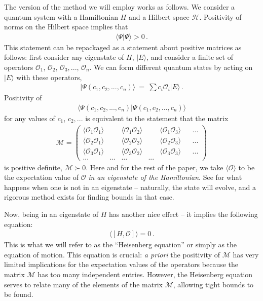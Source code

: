 \documentclass[a4paper,11pt]{article}
\newcommand{\M}{{\mathcal M}}
\numberwithin{equation}{section}
\begin{document}
The version of the method we will employ works as follows. We consider a quantum system with a Hamiltonian $H$ and a Hilbert space $\mathcal H$. Positivity of norms on the Hilbert space implies that 
%
\begin{align}
    \langle \Psi | \Psi \rangle > 0 \, .
\end{align}
%
This statement can be repackaged as a statement about positive matrices as follows: first consider any eigenstate of $H$, $| E \rangle$, and consider a finite set of operators $\mathcal{O}_1$, $\mathcal{O}_2$, $\mathcal{O}_3, ... $, $\mathcal{O}_n$. We can form different quantum states by acting on $|E \rangle$ with these operators,
%
\begin{align}
    | \Psi (c_1, c_2, ..., c_n) \rangle \ = \ \sum c_i \mathcal{O}_i |E \rangle \, .
\end{align}
%
Positivity of 
%
\begin{align}
    \langle \Psi (c_1, c_2, ..., c_n)  | \Psi (c_1, c_2, ..., c_n) \rangle
\end{align}
%
for any values of $c_1$, $c_2, ...$ is equivalent to the statement that the matrix
%
\begin{align}
    \M = \begin{pmatrix}
        \langle \mathcal{O}_1 \mathcal{O}_1 \rangle && \langle \mathcal{O}_1 \mathcal{O}_2 \rangle && \langle \mathcal{O}_1 \mathcal{O}_3 \rangle && ... \\
        \langle \mathcal{O}_2 \mathcal{O}_1 \rangle && \langle \mathcal{O}_2 \mathcal{O}_2 \rangle && \langle \mathcal{O}_2 \mathcal{O}_3 \rangle && ... \\
        \langle \mathcal{O}_3 \mathcal{O}_1 \rangle && \langle \mathcal{O}_3 \mathcal{O}_2 \rangle && \langle \mathcal{O}_3 \mathcal{O}_3 \rangle && ... \\
        ... & ... & ... & ...
    \end{pmatrix}
\end{align}
%
is positive definite, $\M \succ 0$. Here and for the rest of the paper, we take $\langle \mathcal{O} \rangle$ to be the expectation value of $\mathcal{O}$ \textit{in an eigenstate of the Hamiltonian}. See \cite{Lawrence:2024mnj} for what happens when one is not in an eigenstate -- naturally, the state will evolve, and a rigorous method exists for finding bounds in that case.

Now, being in an eigenstate of $H$ has another nice effect -- it implies the following equation:
%
\begin{align}
    \langle [ H , \mathcal{O}] \rangle = 0 \, .
    \label{eq:H_constraint}
\end{align}
%
This is what we will refer to as the ``Heisenberg equation'' or simply as the equation of motion. This equation is crucial: \textit{a priori} the positivity of $\M$ has very limited implications for the expectation values of the operators because the matrix $\M$ has too many independent entries. However, the Heisenberg equation serves to relate many of the elements of the matrix $\M$, allowing tight bounds to be found.
\end{document}
